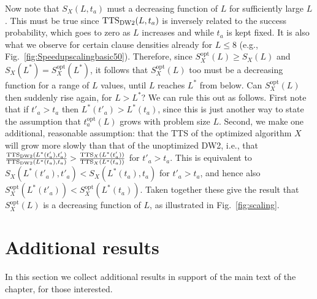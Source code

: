 {Now note that $S_X(L,t_a)$ must a decreasing function of $L$ for sufficiently large $L$. This must be true since $\textrm{TTS}_{\textrm{DW2}}(L,t_a)$ is inversely related to the success probability, which goes to zero as $L$ increases and while $t_a$ is kept fixed. It is also what we observe for certain clause densities already for $L\leq 8$ (e.g., Fig.~\ref{fig:Speedupscalingbasic50}). Therefore, since $S_X^{\textrm{opt}}(L) \geq S_X(L)$ {and} $S_X(L^*) = S_X^{\textrm{opt}}(L^*)$, it follows that $S_X^{\textrm{opt}}(L)$ too must be a decreasing function for a range of $L$ values, until $L$ reaches $L^*$ from below. Can $S_X^{\textrm{opt}}(L)$ then suddenly rise again, for $L>L^*$? We can rule this out as follows. First note that if $t'_a > t_a$ then $L^*(t'_a) > L^*(t_a)$, since this is just another way to state the assumption that $t_a^{\mathrm{opt}}(L)$ grows with problem size $L$. Second, we make one additional, reasonable assumption: that the TTS of the optimized algorithm $X$ will grow more slowly than that of the unoptimized DW2, i.e., that $\frac{\textrm{TTS}_{\textrm{DW2}}(L^*(t'_a),t'_a)}{\textrm{TTS}_{\textrm{DW2}}(L^*(t_a),t_a)} > \frac{\textrm{TTS}_X(L^*(t'_a))}{\textrm{TTS}_X(L^*(t_a))}$ for $t'_a > t_a$. This is equivalent to $S_X(L^*(t'_a),t'_a) < S_X(L^*(t_a),t_a)$ for $t'_a > t_a$, and hence also $S^{\textrm{opt}}_X(L^*(t'_a)) < S^{\textrm{opt}}_X(L^*(t_a))$.
Taken together these give the result that $S_X^{\textrm{opt}}(L)$ is a decreasing function of $L$, as illustrated in Fig.~\ref{fig:scaling}. 
} %



\section{Additional results}
\label{sec:additional}
In this section we collect additional results in support of the main text of the chapter, for those interested.

